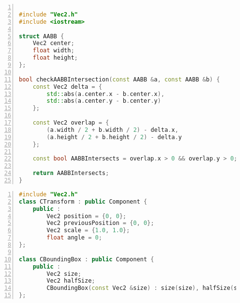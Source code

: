 \documentclass{article}
\begin{document}
\begin{mdframed}[linecolor=black!30!white,linewidth=.5pt,extratopheight=1em]
    \begin{lstlisting}[language=C++, aboveskip=3mm,
        belowskip=3mm,
        showstringspaces=false,
        columns=flexible,
        basicstyle={\small\ttfamily},
        numbers=left,
        numberstyle=\tiny\color{gray},
        keywordstyle=\color{blue},
        commentstyle=\color{dkgreen},
        stringstyle=\color{mauve},
        breaklines=true,
        breakatwhitespace=true,
        tabsize=3,
        xleftmargin=1em]

#include "Vec2.h"
#include <iostream>

struct AABB {
    Vec2 center;
    float width;
    float height;
};

bool checkAABBIntersection(const AABB &a, const AABB &b) {
    const Vec2 delta = {
        std::abs(a.center.x - b.center.x), 
        std::abs(a.center.y - b.center.y)
    };

    const Vec2 overlap = {
        (a.width / 2 + b.width / 2) - delta.x,
        (a.height / 2 + b.height / 2) - delta.y
    };
    
    const bool AABBIntersects = overlap.x > 0 && overlap.y > 0;

    return AABBIntersects;
}

\end{lstlisting}
\end{mdframed}

\begin{mdframed}[linecolor=black!30!white,linewidth=.5pt,extratopheight=1em]
    \begin{lstlisting}[language=C++, aboveskip=3mm,
        belowskip=3mm,
        showstringspaces=false,
        columns=flexible,
        basicstyle={\small\ttfamily},
        numbers=left,
        numberstyle=\tiny\color{gray},
        keywordstyle=\color{blue},
        commentstyle=\color{dkgreen},
        stringstyle=\color{mauve},
        breaklines=true,
        breakatwhitespace=true,
        tabsize=3,
        xleftmargin=1em]
#include "Vec2.h"
class CTransform : public Component {
    public :
        Vec2 position = {0, 0};
        Vec2 previousPosition = {0, 0};
        Vec2 scale = {1.0, 1.0};
        float angle = 0;
};

class CBoundingBox : public Component {
    public :
        Vec2 size;
        Vec2 halfSize;
        CBoundingBox(const Vec2 &size) : size(size), halfSize(size / 2) {}
};

        \end{lstlisting}
\end{mdframed}
\end{document}
